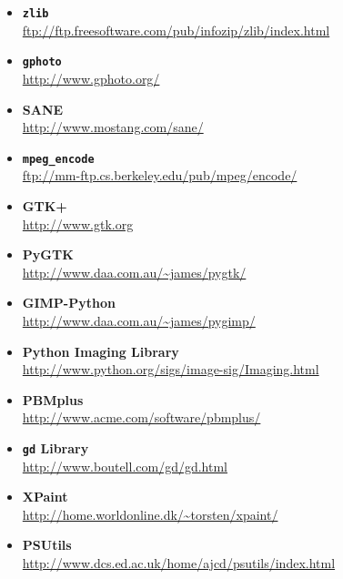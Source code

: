 \documentclass[twoside,11pt]{starlink}
\begin{document}
\begin{itemize}
\item {\bf\label{sc15_available_zlib}\texttt{zlib}}\\
\url{ftp://ftp.freesoftware.com/pub/infozip/zlib/index.html}

\item {\bf\label{sc15_available_gphoto}\texttt{gphoto}}\\
\url{http://www.gphoto.org/}

\item {\bf\label{sc15_available_sane}SANE}\\
\url{http://www.mostang.com/sane/}

\item {\bf\label{sc15_available_mpegencode}\texttt{mpeg\_encode}}\\
\url{ftp://mm-ftp.cs.berkeley.edu/pub/mpeg/encode/}

\item {\bf\label{sc15_available_gtk+}GTK+}\\
\url{http://www.gtk.org}

\item {\bf\label{sc15_available_pygtk}PyGTK}\\
\url{http://www.daa.com.au/~james/pygtk/}

\item {\bf\label{sc15_available_gimppython}GIMP-Python}\\
\url{http://www.daa.com.au/~james/pygimp/}

\item {\bf\label{sc15_available_pythonimg}Python Imaging Library}\\
\url{http://www.python.org/sigs/image-sig/Imaging.html}

\item {\bf\label{sc15_available_pbmplus}PBMplus}\\
\url{http://www.acme.com/software/pbmplus/}

\item {\bf\label{sc15_available_gd}\texttt{gd} Library}\\
\url{http://www.boutell.com/gd/gd.html}

\item {\bf\label{sc15_available_xpaint}{XPaint}}\\
\url{http://home.worldonline.dk/~torsten/xpaint/}

\item {\bf\label{sc15_available_psutils}{PSUtils}}\\
\url{http://www.dcs.ed.ac.uk/home/ajcd/psutils/index.html}

\end{itemize}
\end{document}
